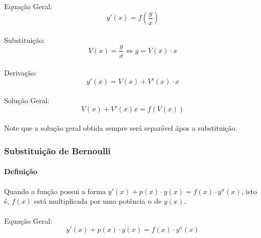 \documentclass{article}
\begin{document}
                \paragraph{}Equação Geral:
                    \begin{equation}
                        y'(x)=f(\frac{y}{x})
                    \end{equation}
                \paragraph{}Substituição:
                    \begin{equation}
                        V(x)=\frac{y}{x} \Leftrightarrow y=V(x) \cdot x
                    \end{equation}
                \paragraph{}Derivação:
                    \begin{equation}
                        y'(x)=V(x)+V'(x) \cdot x
                    \end{equation}
                \paragraph{}Solução Geral:
                    \begin{equation}
                        V(x)+V'(x)x=f(V(x))
                    \end{equation}
                \paragraph{}Note que a solução geral obtida sempre será separável ápos a substituição.

            \subsubsection{Substituição de Bernoulli}
                \paragraph{Definição}Quando a função possui a forma $y'(x)+p(x) \cdot y(x)=f(x) \cdot y^{n}(x)$, isto 
                é, $f(x)$ está multiplicada por uma potência $n$ de $y(x)$.
                \paragraph{}Equação Geral:
                    \begin{equation}
                        y'(x)+p(x) \cdot y(x)=f(x) \cdot y^{n}(x)
                    \end{equation}
\end{document}
